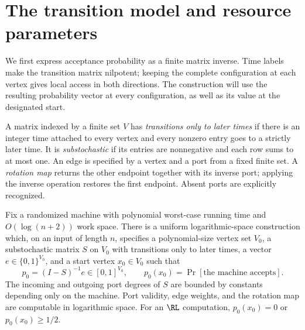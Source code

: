 \section{The transition model and resource parameters}\label{sec:model}

We first express acceptance probability as a finite matrix inverse.
Time labels make the transition matrix nilpotent; keeping the complete
configuration at each vertex gives local access in both directions.
The construction will use the resulting probability vector at every
configuration, as well as its value at the designated start.

A matrix indexed by a finite set $V$ has \emph{transitions only to later times} if
there is an integer time attached to every vertex and every nonzero
entry goes to a strictly later time. It is \emph{substochastic} if its
entries are nonnegative and each row sums to at most one. An edge is
specified by a vertex and a port from a fixed finite set. A \emph{rotation map} returns the other endpoint together with its inverse
port; applying the inverse operation restores the first endpoint.
Absent ports are explicitly recognized.

\begin{lemma}\label{lem:model-reduction}
Fix a randomized machine with polynomial worst-case running time and
$O(\log(n+2))$ work space. There is a uniform logarithmic-space
construction which, on an input of length $n$, specifies a polynomial-size
vertex set $V_0$, a substochastic matrix $S$ on $V_0$ with transitions only to later times,
a vector $e\in\{0,1\}^{V_0}$, and a start vertex $x_0\in V_0$ such that
\[
 p_0=(I-S)^{-1}e\in[0,1]^{V_0},
 \qquad p_0(x_0)=\Pr[\text{the machine accepts}].
\]
The incoming and outgoing port degrees of $S$ are bounded by constants
depending only on the machine. Port validity, edge weights, and the rotation map
are computable in logarithmic space.
For an $\RL$ computation, $p_0(x_0)=0$ or $p_0(x_0)\ge1/2$.
\end{lemma}

